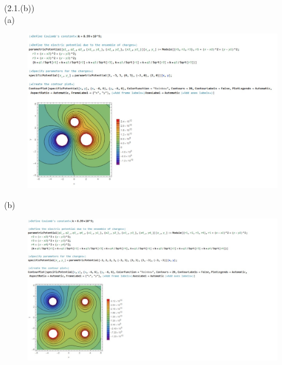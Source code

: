 \documentclass[journal,12pt,onecolumn]{IEEEtran}
\theoremstyle{remark}
\begin{document}
   \newpage
(2.1.(b))\\
(a)
\begin{figure}[H]
    \centering
     \includegraphics[scale=0.40]{figs/v1.jpeg}
    \caption{}    
    \label{fig:ishitha.em.fig1}
\end{figure}

(b)\begin{figure}[H]
    \centering
     \includegraphics[scale=0.5]{figs/v2.jpeg}
    \caption{}    
    \label{fig:ishitha.em.fig1}
   \end{figure} 
   
   \newpage
\end{document}
